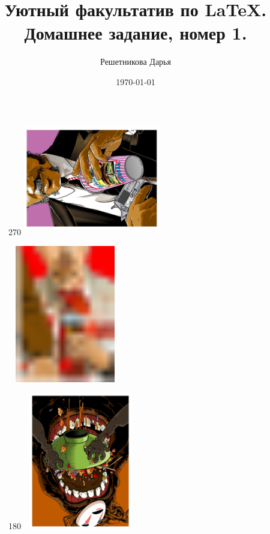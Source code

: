\documentclass[12pt, a4paper]{article}
\author{Решетникова Дарья}
\title{Уютный факультатив по \LaTeX . Домашнее задание, номер 1.}
\date{\today}
\begin{document}
\begin{figure}[h!]
	\begin{minipage}[h!]{0.3\linewidth} 
		
	\begin{turn}{270}
		\includegraphics[height=5cm, width=6cm]{pop1.pdf}
	\end{turn}
	\end{minipage}
	\hfill
		\begin{minipage}[h!]{0.3\linewidth}
	 \includegraphics[height=6cm, width=5cm]{pop3.pdf}
	\end{minipage}
\hfill
	\begin{minipage}[h!]{0.3\linewidth} 
	
	\begin{turn}{180}
		\includegraphics[height=6cm, width=5cm]{pop6.pdf}
	\end{turn}
	\end{minipage}
\end{figure}
\end{document}
